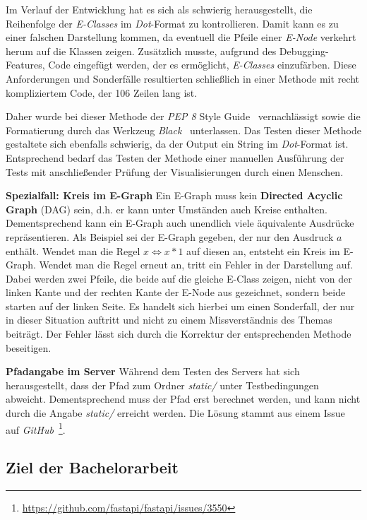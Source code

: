 Im Verlauf der Entwicklung hat es sich als schwierig herausgestellt, die Reihenfolge der \textit{E-Classes} im \textit{Dot}-Format zu kontrollieren.
Damit kann es zu einer falschen Darstellung kommen, da eventuell die Pfeile einer \textit{E-Node} verkehrt herum auf die Klassen zeigen.
Zusätzlich musste, aufgrund des Debugging-Features, Code eingefügt werden, der es ermöglicht, \textit{E-Classes} einzufärben.
Diese Anforderungen und Sonderfälle resultierten schließlich in einer Methode mit recht kompliziertem Code, der 106 Zeilen lang ist.

Daher wurde bei dieser Methode der \textit{PEP 8} Style Guide~\cite{pep} vernachlässigt sowie die Formatierung durch das Werkzeug \textit{Black}~\cite{black} unterlassen.
Das Testen dieser Methode gestaltete sich ebenfalls schwierig, da der Output ein String im \textit{Dot}-Format ist. Entsprechend bedarf das Testen der Methode
einer manuellen Ausführung der Tests mit anschließender Prüfung der Visualisierungen durch einen Menschen.

\noindent\textbf{Spezialfall: Kreis im E-Graph} Ein E-Graph muss kein \textbf{Directed Acyclic Graph} (DAG) sein, d.h. er kann unter Umständen auch Kreise enthalten. 
Dementsprechend kann ein E-Graph auch unendlich viele äquivalente Ausdrücke repräsentieren.
Als Beispiel sei der E-Graph gegeben, der nur den Ausdruck $a$ enthält. Wendet man die Regel $x \Leftrightarrow x * 1$ auf diesen an, entsteht ein Kreis im E-Graph.
Wendet man die Regel erneut an, tritt ein Fehler in der Darstellung auf. Dabei werden zwei Pfeile, die beide auf die gleiche E-Class zeigen, nicht von der linken Kante und der rechten
Kante der E-Node aus gezeichnet, sondern beide starten auf der linken Seite. Es handelt sich hierbei um einen Sonderfall, der nur in dieser Situation auftritt und nicht zu einem 
Missverständnis des Themas beiträgt. Der Fehler lässt sich durch die Korrektur der entsprechenden Methode beseitigen.

\noindent\textbf{Pfadangabe im Server} Während dem Testen des Servers hat sich herausgestellt, dass der Pfad zum Ordner \textit{static/} unter Testbedingungen abweicht.
Dementsprechend muss der Pfad erst berechnet werden, und kann nicht durch die Angabe \textit{static/} erreicht werden. Die Lösung stammt aus einem Issue auf 
\textit{GitHub}~\footnote{\hspace{1.5mm}\url{https://github.com/fastapi/fastapi/issues/3550}}.

\subsection{Ziel der Bachelorarbeit}\label{sub:ziel}


